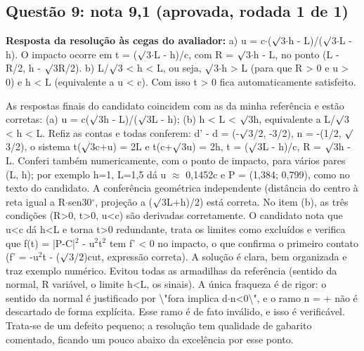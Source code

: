 \documentclass{article}%
\begin{document}
\subsection*{Questão 9: nota 9,1 (aprovada, rodada 1 de 1)}%
\textbf{Resposta da resolução às cegas do avaliador:} a) u = c$\cdot$($\surd$3$\cdot$h - L)/($\surd$3$\cdot$L - h). O impacto ocorre em t = ($\surd$3$\cdot$L - h)/c, com R = $\surd$3$\cdot$h - L, no ponto (L - R/2, h - $\surd$3R/2).\newline%
\newline%
b) L/$\surd$3 < h < L, ou seja, $\surd$3$\cdot$h > L (para que R > 0 e u > 0) e h < L (equivalente a u < c). Com isso t > 0 fica automaticamente satisfeito.\par %
As respostas finais do candidato coincidem com as da minha referência e estão corretas: (a) u = c($\surd$3h - L)/($\surd$3L - h); (b) h < L < $\surd$3h, equivalente a L/$\surd$3 < h < L. Refiz as contas e todas conferem: d' - d = (-$\surd$3/2, -3/2), n = -(1/2, $\surd$3/2), o sistema t($\surd$3c+u) = 2L e t(c+$\surd$3u) = 2h, t = ($\surd$3L - h)/c, R = $\surd$3h - L. Conferi também numericamente, com o ponto de impacto, para vários pares (L, h); por exemplo h=1, L=1,5 dá u $\approx$ 0,1452c e P = (1,384; 0,799), como no texto do candidato. A conferência geométrica independente (distância do centro à reta igual a R$\cdot$sen30$^\circ$, projeção a ($\surd$3L+h)/2) está correta. No item (b), as três condições (R>0, t>0, u<c) são derivadas corretamente. O candidato nota que u<c dá h<L e torna t>0 redundante, trata os limites como excluídos e verifica que f(t) = |P-C|$^2$ - u$^2$t$^2$ tem f' < 0 no impacto, o que confirma o primeiro contato (f' = -u$^2$t - ($\surd$3/2)cut, expressão correta). A solução é clara, bem organizada e traz exemplo numérico. Evitou todas as armadilhas da referência (sentido da normal, R variável, o limite h<L, os sinais). A única fraqueza é de rigor: o sentido da normal é justificado por \textbackslash{}"fora implica d$\cdot$n<0\textbackslash{}", e o ramo n = + não é descartado de forma explícita. Esse ramo é de fato inválido, e isso é verificável. Trata{-}se de um defeito pequeno; a resolução tem qualidade de gabarito comentado, ficando um pouco abaixo da excelência por esse ponto.%
\end{document}
